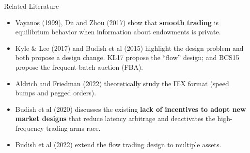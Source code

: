 \documentclass[10pt]{beamer}
\begin{document}
\begin{frame}{Related Literature}
    \begin{itemize}
    
    \item Vayanos (1999), Du and Zhou (2017) show that \textbf{smooth trading} is equilibrium behavior when information about endowments is private. 

    \item Kyle \& Lee (2017) and Budish et al (2015) highlight the design problem and both propose a design change. KL17 propose the ``flow'' design; and BCS15 propose the frequent batch auction (FBA). %

    \item Aldrich and Friedman (2022) theoretically study the IEX format (speed bumps and pegged orders). %


    \item Budish et al (2020) discusses the existing \textbf{lack of incentives to adopt new market designs} that reduce latency arbitrage and deactivates the high-frequency trading arms race. %

    \item Budish et al (2022) extend the flow trading design to multiple assets. %



\end{itemize}
\end{frame}
\end{document}
